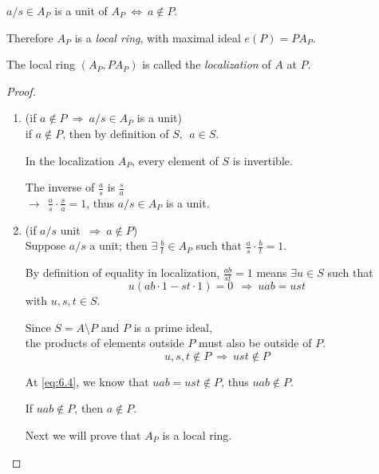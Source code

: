 \documentclass{article}
\theoremstyle{definition}
\newenvironment{prop}[1]
{\renewcommand\theinnerprop{#1}\innerprop}
{\endinnerprop}
\begin{document}
\begin{prop}{6.4} \label{6.4}
  $a/s \in A_P$ is a unit of $A_P ~\Longleftrightarrow~ a \not\in P$.

  Therefore $A_P$ is a \emph{local ring}, with maximal ideal $e(P)=P A_P$.

  The local ring $(A_P, PA_P)$ is called the \emph{localization} of $A$ at $P$.
\end{prop}
\begin{proof}
  \begin{enumerate}
    \item[$\Longleftarrow$] (if $a \not\in P ~\Longrightarrow~ a/s \in A_P$ is a unit)\\

      if $a \not\in P$, then by definition of $S,~~ a \in S$.

      In the localization $A_P$, every element of $S$ is invertible.

      The inverse of $\frac{a}{s}$ is $\frac{s}{a}$\\
      \hspace*{2em}$\longrightarrow~~ \frac{a}{s} \cdot \frac{s}{a} = 1$, thus
      $a/s \in A_P$ is a unit.

    \item[$\Longrightarrow$] (if $a/s$ unit $~\Longrightarrow~ a \not\in P$)\\

      Suppose $a/s$ a unit; then $\exists~ \frac{b}{t} \in A_P$ such that
      $\frac{a}{s} \cdot \frac{b}{t} = 1$.

      By definition of equality in localization, $\frac{ab}{st}=1$ means $\exists u \in S$ such that
      \begin{equation}
        u(ab \cdot 1 - st \cdot 1) = 0~~ \Longrightarrow~ uab=ust
        \label{eq:6.4}
      \end{equation}
      with $u,s,t \in S$.

      Since $S=A \setminus P$ and $P$ is a prime ideal,\\
      the products of elements outside $P$ must also be outside of $P$.
      $$u,s,t \not\in P ~\Longrightarrow~ ust \not\in P$$

      At \eqref{eq:6.4}, we know that $uab=ust \not\in P$, thus $uab \not\in P$.

      If $uab \not\in P$, then $a \not\in P$.


      Next we will prove that $A_P$ is a local ring.\\


\end{enumerate}
\end{proof}
\end{document}
